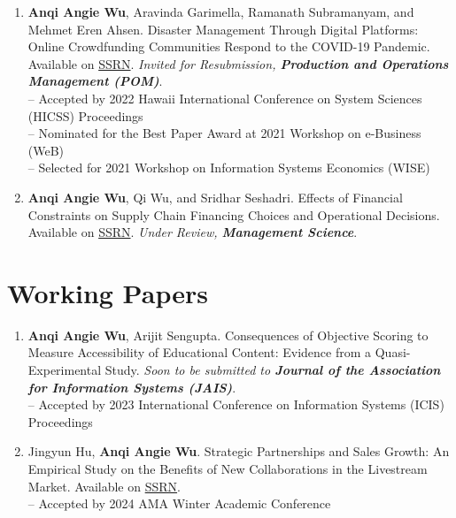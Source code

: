 \documentclass[margin,line]{resume}
\begin{document}
\begin{resume}
\begin{enumerate}[topsep=0pt, leftmargin=*]
         \item \textbf{Anqi Angie Wu}, Aravinda Garimella, Ramanath Subramanyam, and Mehmet Eren Ahsen. Disaster Management Through Digital Platforms: Online Crowdfunding Communities Respond to the COVID-19 Pandemic. Available on \href{https://papers.ssrn.com/abstract=3779438}{{SSRN}}. \textit{Invited for Resubmission, \textbf{Production and Operations Management (POM)}}. \\ 	     [0.3em]
         -- Accepted by 2022 Hawaii International Conference on System Sciences (HICSS) Proceedings\\
         -- Nominated for the Best Paper Award at 2021 Workshop on e-Business (WeB)\\
         -- Selected for 2021 Workshop on Information Systems Economics (WISE)\\[-0.5em]

 \item \textbf{Anqi Angie Wu}, Qi Wu, and Sridhar Seshadri. Effects of Financial Constraints on Supply Chain Financing Choices and Operational Decisions. Available on \href{https://ssrn.com/abstract=4603080}{{SSRN}}. \textit{Under Review, \textbf{Management Science}}. 
 	  \end{enumerate}   

\section{\mysidestyle Working Papers}  	  \begin{enumerate}[topsep=0pt, leftmargin=*]     
       \item \textbf{Anqi Angie Wu}, Arijit Sengupta. Consequences of Objective Scoring to Measure Accessibility of Educational Content: Evidence from a Quasi-Experimental Study. \textit{Soon to be submitted to \textbf{Journal of the Association for Information Systems (JAIS)}}.  \\[0.3em]
       -- Accepted by 2023 International Conference on Information Systems (ICIS) Proceedings\\[-0.5em]
    \newpage 
           \item Jingyun Hu, \textbf{Anqi Angie Wu}. Strategic Partnerships and Sales Growth: An Empirical Study on the Benefits of New Collaborations in the Livestream Market. Available on \href{https://papers.ssrn.com/abstract=4656779}{{SSRN}}. \\[0.3em]
       -- Accepted by 2024 AMA Winter Academic Conference\\[-0.5em]


\end{enumerate}
\end{resume}
\end{document}
